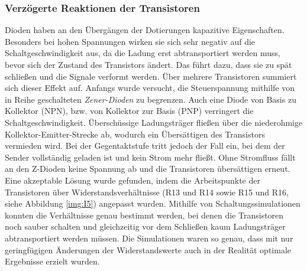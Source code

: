 \subsubsection{Verzögerte Reaktionen der Transistoren}
Dioden haben an den Übergängen der Dotierungen kapazitive Eigenschaften. Besonders bei hohen Spannungen wirken sie sich sehr negativ auf die Schaltgeschwindigkeit aus, da die Ladung erst abtransportiert werden muss, bevor sich der Zustand des Transistors ändert. Das führt dazu, dass sie zu spät schließen und die Signale verformt werden. Über mehrere Transistoren summiert sich dieser Effekt auf. Anfangs wurde versucht, die Steuerspannung mithilfe von in Reihe geschalteten \textit{Zener-Dioden} zu begrenzen. Auch eine Diode von Basis zu Kollektor (NPN), bzw. von Kollektor zur Basis (PNP) verringert die Schaltgeschwindigkeit. Überschüssige Ladungsträger fließen über die niederohmige Kollektor-Emitter-Strecke ab, wodurch ein Übersättigen des Transistors vermieden wird. Bei der Gegentaktstufe tritt jedoch der Fall ein, bei dem der Sender vollständig geladen ist und kein Strom mehr fließt. Ohne Stromfluss fällt an den Z-Dioden keine Spannung ab und die Transistoren übersättigen erneut.\\
Eine akzeptable Lösung wurde gefunden, indem die Arbeitspunkte der Transistoren über Widerstandsverhältnisse (R13 und R14 sowie R15 und R16, siehe Abbildung \ref{img:I5}) angepasst wurden. Mithilfe von Schaltungssimulationen konnten die Verhältnisse genau bestimmt werden, bei denen die Transistoren noch sauber schalten und gleichzeitig vor dem Schließen kaum Ladungsträger abtransportiert werden müssen. Die Simulationen waren so genau, dass mit nur geringfügigen Änderungen der Widerstandswerte auch in der Realität optimale Ergebnisse erzielt wurden.

